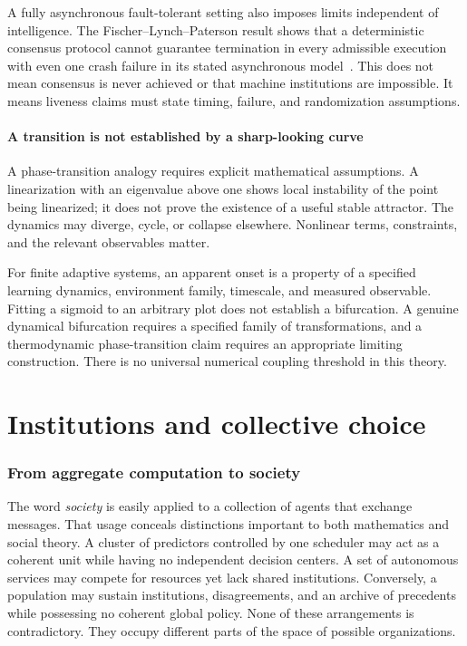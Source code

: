 \documentclass[11pt,letterpaper]{article}
\theoremstyle{plain}
\theoremstyle{definition}
\theoremstyle{remark}
\begin{document}
A fully asynchronous fault-tolerant setting also imposes limits independent of intelligence. The Fischer--Lynch--Paterson result shows that a deterministic consensus protocol cannot guarantee termination in every admissible execution with even one crash failure in its stated asynchronous model~\cite{flp}. This does not mean consensus is never achieved or that machine institutions are impossible. It means liveness claims must state timing, failure, and randomization assumptions.

\subsection{A transition is not established by a sharp-looking curve}
A phase-transition analogy requires explicit mathematical assumptions. A linearization with an eigenvalue above one shows local instability of the point being linearized; it does not prove the existence of a useful stable attractor. The dynamics may diverge, cycle, or collapse elsewhere. Nonlinear terms, constraints, and the relevant observables matter.

For finite adaptive systems, an apparent onset is a property of a specified learning dynamics, environment family, timescale, and measured observable. Fitting a sigmoid to an arbitrary plot does not establish a bifurcation. A genuine dynamical bifurcation requires a specified family of transformations, and a thermodynamic phase-transition claim requires an appropriate limiting construction. There is no universal numerical coupling threshold in this theory.

\clearpage\part{Institutions and collective choice}
\section{From aggregate computation to society}\label{sec:society}

The word \emph{society} is easily applied to a collection of agents that exchange messages. That usage conceals distinctions important to both mathematics and social theory. A cluster of predictors controlled by one scheduler may act as a coherent unit while having no independent decision centers. A set of autonomous services may compete for resources yet lack shared institutions. Conversely, a population may sustain institutions, disagreements, and an archive of precedents while possessing no coherent global policy. None of these arrangements is contradictory. They occupy different parts of the space of possible organizations.
\end{document}
